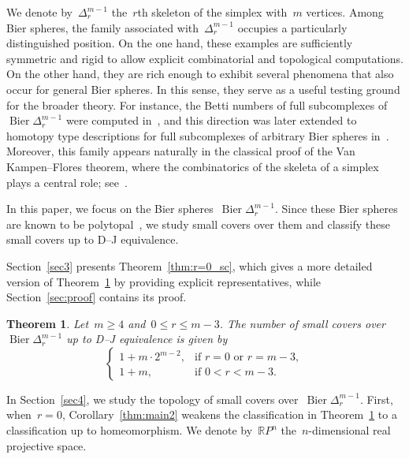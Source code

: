 \documentclass[11pt]{amsart}
\theoremstyle{plain}
\newtheorem{theorem}{Theorem}[section]
\numberwithin{equation}{section}
\theoremstyle{definition}
\newcommand{\RP}{\mathbb{R}P}
\DeclareMathOperator{\Bier}{Bier}
\begin{document}
We denote by~$\Delta_r^{m-1}$ the~$r$th skeleton of the simplex with~$m$ vertices.
Among Bier spheres, the family associated with~$\Delta_r^{m-1}$ occupies a particularly distinguished position.
On the one hand, these examples are sufficiently symmetric and rigid to allow explicit combinatorial and topological computations.  
On the other hand, they are rich enough to exhibit several phenomena that also occur for general Bier spheres.  
In this sense, they serve as a useful testing ground for the broader theory.
For instance, the Betti numbers of full subcomplexes of~$\Bier\Delta_r^{m-1}$ were computed in~\cite{Heudtlass-Katthan2012}, and this direction was later extended to homotopy type descriptions for full subcomplexes of arbitrary Bier spheres in~\cite{Choi-Yoon-Yu2026}.  
Moreover, this family appears naturally in the classical proof of the Van Kampen--Flores theorem, where the combinatorics of the skeleta of a simplex plays a central role; see~\cite{Matousek2003book}.

In this paper, we focus on the Bier spheres~$\Bier\Delta_{r}^{m-1}$.
Since these Bier spheres are known to be polytopal~\cite{Jevtic-Timotijevic-Zivaljevic2021}, we study small covers over them and classify these small covers up to D--J equivalence.

Section~\ref{sec3} presents Theorem~\ref{thm:r=0_sc}, which gives a more detailed version of Theorem~\ref{thm:main1} by providing explicit representatives, while Section~\ref{sec:proof} contains its proof.
\begin{theorem}\label{thm:main1}
    Let~$m\geq 4$ and~$0\leq r\leq m-3$.
    The number of small covers over~$\Bier\Delta_{r}^{m-1}$ up to D--J equivalence is given by
    $$
        \begin{cases}
            1+m \cdot 2^{m-2}, & \text{if } r = 0 \text{ or } r=m-3,\\
            1+m, & \text{if } 0 < r < m-3.
        \end{cases}
    $$
\end{theorem}

In Section~\ref{sec4}, we study the topology of small covers over~$\Bier\Delta_{r}^{m-1}$.
First, when~$r=0$, Corollary~\ref{thm:main2} weakens the classification in Theorem~\ref{thm:main1} to a classification up to homeomorphism.
We denote by~$\RP^n$ the~$n$-dimensional real projective space.
\end{document}

